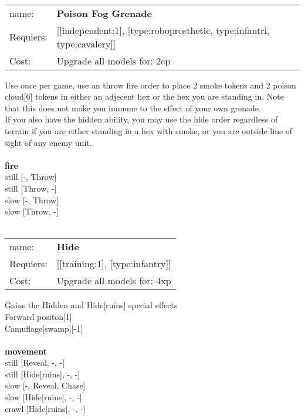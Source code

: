 \ \\
\begin{tabular}{ll}
name: & {\bf Poison Fog Grenade } \\
Requiers: & [[independent:1], [type:roboprosthetic, type:infantri, type:cavalery]] \\
Cost: & Upgrade all models for: 2cp \\
\end{tabular}

Use once per game, use an throw fire order to place 2 smoke tokens and 2 poison cloud[6] tokens in either an adjecent hex or the hex you are standing in. Note that this does not make you immune to the effect of your own grenade.\\ 
If you also have the hidden ability, you may use the hide order regardless of terrain if you are either standing in a hex with smoke, or you are outside line of sight of any enemy unit. \\ 








\ \\ {\bf fire } \\
still [-, Throw] \\
still [Throw, -] \\
slow [-, Throw] \\
slow [Throw, -] \\

\ \\
\begin{tabular}{ll}
name: & {\bf Hide } \\
Requiers: & [[training:1], [type:infantry]] \\
Cost: & Upgrade all models for: 4xp \\
\end{tabular}

Gains the Hidden and Hide[ruins] special effects\\ 
Forward positon[1]\\ 
Camuflage[swamp][-1]\\ 








\ \\ {\bf movement } \\
still [Reveal, -, -] \\
still [Hide[ruins], -, -] \\
slow [-, Reveal, Chase] \\
slow [Hide[ruins], -, -] \\
crawl [Hide[ruins], -, -] \\

